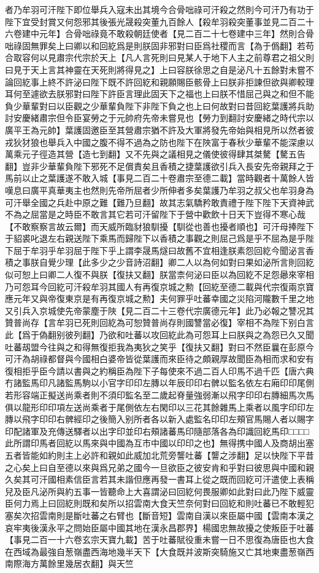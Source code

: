 者乃牟羽可汗陛下即位舉兵入寇未出其境今合骨咄祿可汗殺之然則今可汗乃有功于陛下宜受封賞又何怨邪其後張光晟殺突董九百餘人【殺牟羽殺突董事並見二百二十六卷建中元年】合骨咄祿竟不敢殺朝廷使者【見二百二十七卷建中三年】然則合骨咄祿固無罪矣上曰卿以和回紇爲是則朕固非邪對曰臣爲社稷而言【為于僞翻】若苟合取容何以見肅宗代宗於天上【凡人言死則曰見某人于地下人主之前尊君之祖父則曰見于天上言其神靈在天死則將得見之】上曰容朕徐思之自是泌凡十五餘對未嘗不論回紇事上終不許泌曰陛下既不許回紇和親願賜臣骸骨上曰朕非拒諫但欲與卿較理耳何至遽欲去朕邪對曰陛下許臣言理此固天下之福也上曰朕不惜屈己與之和但不能負少華輩對曰以臣觀之少華輩負陛下非陛下負之也上曰何故對曰昔回紇葉護將兵助討安慶緒肅宗但令臣宴勞之于元帥府先帝未嘗見也【勞力到翻討安慶緒之時代宗以廣平王為元帥】葉護固邀臣至其營肅宗猶不許及大軍將發先帝始與相見所以然者彼戎狄犲狼也舉兵入中國之腹不得不過為之防也陛下在陜富于春秋少華輩不能深慮以萬乘元子徑造其營【造七到翻】又不先與之議相見之儀使彼得肆其桀驁【驁五告翻】豈非少華輩負陛下邪死不足償責矣且香積之捷葉護欲引兵入長安先帝親拜之于馬前以止之葉護遂不敢入城【事見二百二十卷肅宗至德二載】當時觀者十萬餘人皆嘆息曰廣平真華夷主也然則先帝所屈者少所伸者多矣葉護乃牟羽之叔父也牟羽身為可汗舉全國之兵赴中原之難【難乃旦翻】故其志氣驕矜敢責禮于陛下陛下天資神武不為之屈當是之時臣不敢言其它若可汗留陛下于營中歡飲十日天下豈得不寒心哉【不敢察察言故云爾】而天威所臨豺狼馴擾【馴從也善也擾者順也】可汗母捧陛下于貂裘叱退左右親送陛下乘馬而歸陛下以香積之事觀之則屈己爲是乎不屈為是乎陛下屈于牟羽乎牟羽屈于陛下乎上謂李晟馬燧曰故舊不宜相逢朕素怨回紇今聞泌言香積之事朕自覺少理【此多少之少音詩沼翻】卿二人以為何如對曰果如泌所言則回紇似可恕上曰卿二人復不與朕【復扶又翻】朕當柰何泌曰臣以為回紇不足怨曏來宰相乃可怨耳今回紇可汗殺牟羽其國人有再復京城之勲【回紇至德二載與代宗復兩京寶應元年又與帝復東京是有再復京城之勲】夫何罪乎吐蕃幸國之災陷河隴數千里之地又引兵入京城使先帝蒙塵于陜【見二百二十三卷代宗廣德元年】此乃必報之讐况其贊普尚存【言牟羽已死則回紇為可恕贊普尚存則國讐當必復】宰相不為陛下别白言此【爲于偽翻别彼列翻】乃欲和吐蕃以攻回紇此為可怨耳上曰朕與之為怨已久又聞吐蕃刼盟今往與之和得無復拒我為夷狄之笑乎【復扶又翻】對曰不然臣曩在彭原今可汗為胡祿都督與今國相白婆帝皆從葉護而來臣待之頗親厚故聞臣為相而求和安有復相拒乎臣今請以書與之約稱臣為陛下子每使來不過二百人印馬不過千匹【唐六典冇諸監馬印凡諸監馬駒以小官字印印左膞以年辰印印右髀以監名依左右廂印印尾側若形容端正擬送尚乘者則不須印監名至二歲起脊量強弱漸以飛字印印右膞細馬次馬俱以龍形印印項左送尚乘者于尾側依左右閑印以三花其餘雜馬上乘者以風字印印左膞以飛字印印右髀經印之後簡入别所者各以新入處監名印印左頰官馬賜人者以賜字印配諸軍及充傳送驛者以出字印並印右頰諸蕃馬印隨部落各為印識回紇馬印□□□□此所謂印馬者回紇以馬來與中國為互市中國以印印之也】無得携中國人及商胡出塞五者皆能如約則主上必許和親如此威加北荒旁讋吐蕃【讋之涉翻】足以快陛下平昔之心矣上曰自至德以來與爲兄弟之國今一旦欲臣之彼安肯和乎對曰彼思與中國和親久矣其可汗國相素信臣言若其未諧但應再發一書耳上從之既而回紇可汗遣使上表稱兒及臣凡泌所與約五事一皆聽命上大喜謂泌曰回紇何畏服卿如此對曰此乃陛下威靈臣何力焉上曰回紇則既和矣所以招雲南大食天竺奈何對曰回紇和則吐蕃已不敢輕犯塞矣次招雲南則是斷吐蕃之右臂也【斷音短】雲南自漢以來臣屬中國【雲南本漢之哀牢夷後漢永平之問始臣屬中國其地在漢永昌郡界】楊國忠無故擾之使叛臣于吐蕃【事見二百一十六卷玄宗天寶九載】苦于吐蕃賦役重未嘗一日不思復為唐臣也大食在西域為最強自葱嶺盡西海地幾半天下【大食既并波斯突騎施又亡其地東盡葱嶺西南際海方萬餘里幾居衣翻】與天竺